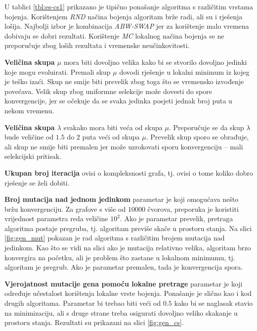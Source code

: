 \documentclass[times, utf8, diplomski, numeric]{fer}
\begin{document}
U tablici \ref{tbl:es-cs1} prikazano je tipično ponašanje algoritma s različitim vrstama bojenja. Korištenjem \emph{RND} načina bojenja algoritam brže radi, ali su i rješenja lošija. Najbolji izbor je kombinacija \emph{ABW-SWAP} jer za korištenje malo vremena dobivaju se dobri rezultati. Korištenje \emph{MC} lokalnog načina bojenja se ne preporučuje zbog loših rezultata i vremenske neučinkovitosti.

\textbf{Veličina skupa $\mu$} mora biti dovoljno velika kako bi se stvorilo dovoljno jedinki koje mogu evoluirati. Premali skup $\mu$ dovodi rješenje u lokalni minimum iz kojeg je teško izaći. Skup ne smije biti prevelik zbog toga što se vremensko izvođenje povećava. Velik skup zbog uniformne selekcije može dovesti do spore konvergencije, jer se očekuje da se svaka jedinka posjeti jednak broj puta u nekom vremenu.

\textbf{Veličina skupa $\lambda$} svakako mora biti veća od skupa $\mu$. Preporučuje se da skup $\lambda$ bude veličine od $1.5$ do $2$ puta veći od skupa $\mu$. Prevelik skup sporo se obrađuje, ali skup ne smije biti premalen jer može uzrokovati sporu konvergenciju -- mali selekcijski pritisak.

\textbf{Ukupan broj iteracija} ovisi o kompleksnosti grafa, tj. ovisi o tome koliko dobro rješenje se želi dobiti.

\textbf{Broj mutacija nad jednom jedinkom} parametar je koji omogućava nešto bržu konvergenciju. Za grafove s više od $10000$ čvorova, preporuka je koristiti vrijednost parametra reda veličine $10^2$. Ako je parametar prevelik, pretraga algoritma postaje pregruba, tj. algoritam previše skače u prostoru stanja. Na slici \ref{fig:gen_mut} pokazan je rad algoritma s različitim brojem mutacija nad jedinkom. Kao što se vidi na slici ako je mutacija relativno velika, algoritam brzo konvergira na početku, ali je problem što zastane u lokalnom minimumu, tj. algoritam je pregrub. Ako je parametar premalen, tada je konvergencija spora.

\textbf{Vjerojatnost mutacije gena pomoću lokalne pretrage} parametar je koji određuje učestalost korištenja lokalne vrste bojenja. Ponašanje je slično kao i kod drugih algoritama. Parametar bi trebao biti veći od $0.5$ kako bi se naglasak stavio na minimizaciju, ali s druge strane treba osigurati dovoljno veliko skakanje u prostoru stanja. Rezultati su prikazani na slici \ref{fig:gen_cs}.
\end{document}
